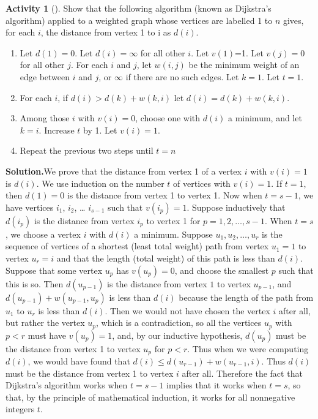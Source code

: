 \documentclass[10pt,]{book}
\theoremstyle{plain}
\theoremstyle{definition}
\newtheorem{activity}[project]{Activity}
\numberwithin{equation}{chapter}
\newcommand{\lt}{<}
\begin{document}
\begin{activity}[]\label{Dijkstra}
Show that the following algorithm (known as Dijkstra's algorithm) applied to a weighted graph whose vertices are labelled 1 to \(n\) gives, for each \(i\), the distance from vertex 1 to i as \(d(i)\). \leavevmode%
\begin{enumerate}
\item\hypertarget{li-34}{}Let \(d(1) = 0\). Let \(d(i) = \infty\) for all other \(i\).  Let \(v(1)\)=1. Let \(v(j) = 0\) for all other \(j\).  For each \(i\) and \(j\), let \(w(i,j)\) be the minimum weight of an edge between \(i\) and \(j\), or \(\infty\) if there are no such edges.  Let \(k=1\).  Let \(t=1\).%
\item\hypertarget{li-35}{}For each \(i\), if \(d(i)>d(k) + w(k,i)\) let \(d(i)= d(k) +w(k,i)\).%
\item\hypertarget{li-36}{}Among those \(i\) with \(v(i)=0\), choose one with \(d(i)\) a minimum, and let \(k=i\).  Increase \(t\) by 1. Let \(v(i) =1.\)%
\item\hypertarget{li-37}{}Repeat the previous two steps until \(t=n\)%
\end{enumerate}
%
\par\medskip\noindent%
\textbf{Solution.}\quad We prove that the distance from vertex 1 of a vertex \(i\) with \(v(i)=1\) is \(d(i)\). We use induction on the number \(t\) of vertices with \(v(i)=1\). If \(t=1\), then \(d(1)=0\) is the distance from vertex 1 to vertex 1. Now when \(t=s-1\), we have vertices \(i_1\), \(i_2\), \dots{} \(i_{s-1}\) such that \(v(i_p)=1\). Suppose inductively that \(d(i_p)\) is the distance from vertex \(i_p\) to vertex 1 for \(p=1,2,\ldots,s-1\). When \(t=s\), we choose a vertex \(i\) with \(d(i)\) a minimum. Suppose \(u_1,u_2,\ldots, u_r\) is the sequence of vertices of a shortest (least total weight) path from vertex \(u_1=1\) to vertex \(u_r=i\) and that the length (total weight) of this path is less than \(d(i)\). Suppose that some vertex \(u_p\) has \(v(u_p)=0\), and choose the smallest \(p\) such that this is so. Then \(d(u_{p-1})\) is the distance from vertex \(1\) to vertex \(u_{p-1}\), and \(d(u_{p-1}) + w(u_{p-1},u_p)\) is less than \(d(i)\) because the length of the path from \(u_1\) to \(u_r\) is less than \(d(i)\). Then we would not have chosen the vertex \(i\) after all, but rather the vertex \(u_p\), which is a contradiction, so all the vertices \(u_p\) with \(p\lt r\) must have \(v(u_p)=1\), and, by our inductive hypothesis, \(d(u_p)\) must be the distance from vertex 1 to vertex \(u_p\) for \(p\lt r\). Thus when we were computing \(d(i)\), we would have found that \(d(i)\le d(u_{r-1}) +w(u_{r-1},i)\). Thus \(d(i)\) must be the distance from vertex 1 to vertex \(i\) after all. Therefore the fact that Dijkstra's algorithm works when \(t=s-1\) implies that it works when \(t=s\), so that, by the principle of mathematical induction, it works for all nonnegative integers \(t\).%
\end{activity}
\end{document}
